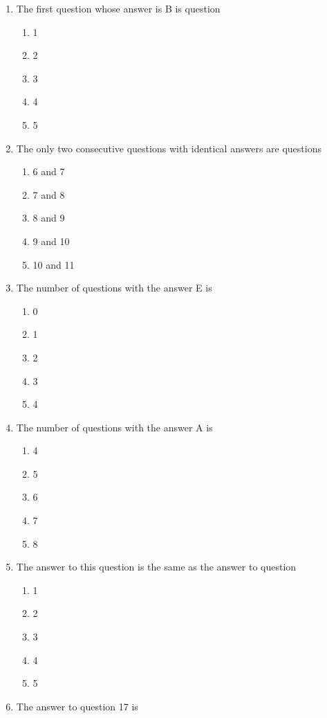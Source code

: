 \documentclass[twoside]{article}
\begin{document}
\begin{enumerate}
\item The first question whose answer is B is question
	\begin{enumerate}[label=(\Alph*)]
	\item 1
	\item 2
	\item 3
	\item 4
	\item 5
	\end{enumerate}
\item The only two consecutive questions with identical answers are questions
	\begin{enumerate}[label=(\Alph*)]
	\item 6 and 7
	\item 7 and 8
	\item 8 and 9
	\item 9 and 10
	\item 10 and 11
	\end{enumerate}
\item The number of questions with the answer E is
	\begin{enumerate}[label=(\Alph*)]
	\item 0
	\item 1
	\item 2
	\item 3
	\item 4
	\end{enumerate}
\item The number of questions with the answer A is
	\begin{enumerate}[label=(\Alph*)]
	\item 4
	\item 5
	\item 6
	\item 7
	\item 8
	\end{enumerate}
\newpage
\item The answer to this question is the same as the answer to question
	\begin{enumerate}[label=(\Alph*)]
	\item 1
	\item 2
	\item 3
	\item 4
	\item 5
	\end{enumerate}
\item The answer to question 17 is
	\begin{enumerate}[label=(\Alph*)]

\end{enumerate}
\end{enumerate}
\end{document}
